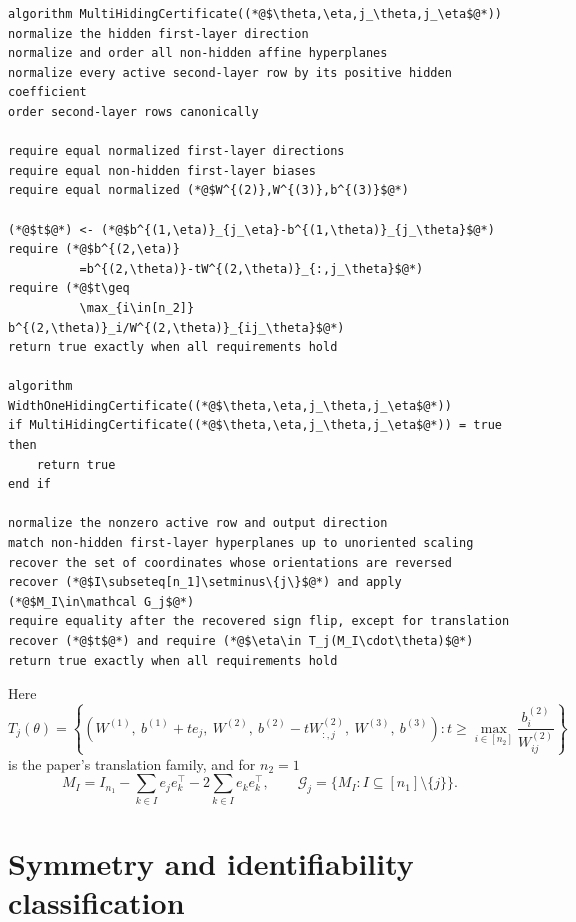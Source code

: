 \documentclass[11pt]{article}
\begin{document}
\begin{lstlisting}[caption={Hiding certificates}]
algorithm MultiHidingCertificate((*@$\theta,\eta,j_\theta,j_\eta$@*))
normalize the hidden first-layer direction
normalize and order all non-hidden affine hyperplanes
normalize every active second-layer row by its positive hidden coefficient
order second-layer rows canonically

require equal normalized first-layer directions
require equal non-hidden first-layer biases
require equal normalized (*@$W^{(2)},W^{(3)},b^{(3)}$@*)

(*@$t$@*) <- (*@$b^{(1,\eta)}_{j_\eta}-b^{(1,\theta)}_{j_\theta}$@*)
require (*@$b^{(2,\eta)}
          =b^{(2,\theta)}-tW^{(2,\theta)}_{:,j_\theta}$@*)
require (*@$t\geq
          \max_{i\in[n_2]} b^{(2,\theta)}_i/W^{(2,\theta)}_{ij_\theta}$@*)
return true exactly when all requirements hold

algorithm WidthOneHidingCertificate((*@$\theta,\eta,j_\theta,j_\eta$@*))
if MultiHidingCertificate((*@$\theta,\eta,j_\theta,j_\eta$@*)) = true then
    return true
end if

normalize the nonzero active row and output direction
match non-hidden first-layer hyperplanes up to unoriented scaling
recover the set of coordinates whose orientations are reversed
recover (*@$I\subseteq[n_1]\setminus\{j\}$@*) and apply (*@$M_I\in\mathcal G_j$@*)
require equality after the recovered sign flip, except for translation
recover (*@$t$@*) and require (*@$\eta\in T_j(M_I\cdot\theta)$@*)
return true exactly when all requirements hold
\end{lstlisting}

Here
\[
  T_j(\theta)
  =
  \left\{
    \left(
      W^{(1)},\
      b^{(1)}+te_j,\
      W^{(2)},\
      b^{(2)}-tW^{(2)}_{:,j},\
      W^{(3)},\
      b^{(3)}
    \right)
    :
    t\geq
    \max_{i\in[n_2]}
    \frac{b^{(2)}_i}{W^{(2)}_{ij}}
  \right\}
\]
is the paper's translation family, and for \(n_2=1\)
\[
  M_I
  =
  I_{n_1}
  -
  \sum_{k\in I}e_je_k^\top
  -
  2\sum_{k\in I}e_ke_k^\top,
  \qquad
  \mathcal G_j
  =
  \{M_I:I\subseteq[n_1]\setminus\{j\}\}.
\]

\section{Symmetry and identifiability classification}
\end{document}
